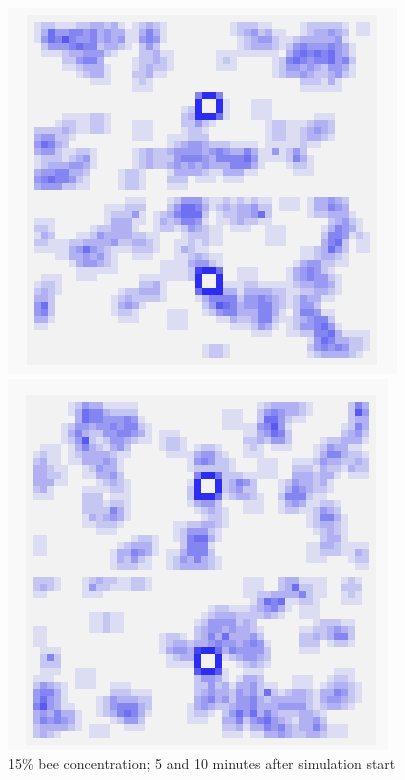 \documentclass[conference,compsoc,onecolumn]{IEEEtran}
\begin{document}
\begin{figure}[!tbp]
	\centering
	\begin{minipage}[b]{0.4\textwidth}
		\includegraphics[width=\textwidth]{../images/hive-15per-05-00-00.PNG}
	\end{minipage}
	\hfill
	\begin{minipage}[b]{0.4\textwidth}
		\includegraphics[width=\textwidth]{../images/hive-15per-10-00-00.PNG}
	\end{minipage}
	\caption{15\% bee concentration; 5 and 10 minutes after simulation start}
	\label{casu-15}
\end{figure}
\end{document}
